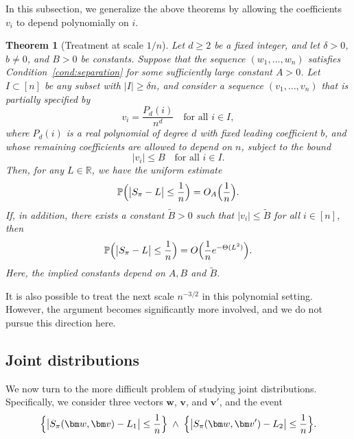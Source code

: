 \documentclass[reqno]{amsart}
\newcommand\R{{\mathbb{R}}}
\renewcommand\P{{\mathbb{P}}}
\newcommand\BMv{{\bm v}}
\newcommand\BMw{{\bm w}}
\theoremstyle{plain}
\newtheorem{theorem}{Theorem}[section]
\theoremstyle{definition}
\begin{document}
In this subsection, we generalize the above theorems by allowing the coefficients
$v_i$ to depend polynomially on $i$.

\begin{theorem}[Treatment at scale $1/n$]\label{thm:cont:poly:1}
Let $d\ge2$ be a fixed integer, and let $\delta>0$, $b\neq0$, and $B>0$ be
constants. Suppose that the sequence $(w_1,\ldots,w_n)$ satisfies
Condition~\ref{cond:separation} for some sufficiently large constant $A>0$.
Let $I\subset[n]$ be any subset with $|I|\ge \delta n$, and consider a sequence
$(v_1,\ldots,v_n)$ that is partially specified by
\[
v_i=\frac{P_d(i)}{n^{d}} \quad \text{for all } i\in I,
\]
where $P_d(i)$ is a real polynomial of degree $d$ with fixed leading coefficient
$b$, and whose remaining coefficients are allowed to depend on $n$, subject to
the bound
\[
|v_i|\le B \quad \text{for all } i\in I.
\]
Then, for any $L\in\R$, we have the uniform estimate
\begin{equation}\label{eqn:poly:u}
\P\Bigl(\bigl|S_{\pi}-L\bigr|\le \frac{1}{n}\Bigr)
= O_{A}\Bigl(\frac{1}{n}\Bigr).
\end{equation}
If, in addition, there exists a constant $\widetilde{B}>0$ such that
$|v_i|\le \widetilde{B}$ for all $i\in[n]$, then
\begin{equation}\label{eqn:poly:L}
\P\Bigl(\bigl|S_{\pi}-L\bigr|\le \frac{1}{n}\Bigr)
= O\Bigl(\frac{1}{n} e^{-\Theta(L^2)}\Bigr).
\end{equation}
Here, the implied constants depend on $A,B$ and $\widetilde{B}$.
\end{theorem}

It is also possible to treat the next scale $n^{-3/2}$ in this polynomial
setting. However, the argument becomes significantly more involved, and we do
not pursue this direction here.

\subsection{Joint distributions}

We now turn to the more difficult problem of studying joint distributions.
Specifically, we consider three vectors $\BMw$, $\BMv$, and $\BMv'$, and the
event
\[
\Bigl\{ \bigl|S_{\pi}(\BMw,\BMv)-L_{1}\bigr|\le \frac{1}{n} \Bigr\}
\;\wedge\;
\Bigl\{ \bigl|S_{\pi}(\BMw,\BMv')-L_{2}\bigr|\le \frac{1}{n} \Bigr\}.
\]
\end{document}
